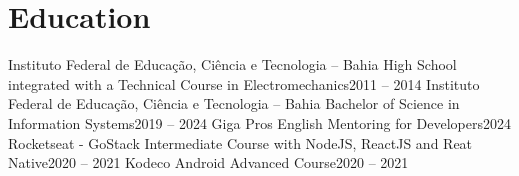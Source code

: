 \section{Education}
  \resumeSubHeadingListStart
    \resumeSubheading
      {Instituto Federal de Educação, Ciência e Tecnologia – Bahia}{}
      {High School integrated with a Technical Course in Electromechanics}{2011 -- 2014}
    \resumeSubheading
      {Instituto Federal de Educação, Ciência e Tecnologia – Bahia}{}
      {Bachelor of Science in Information Systems}{2019 -- 2024}
    \resumeSubheading
      {Giga Pros}{}
      {English Mentoring for Developers}{2024}
    \resumeSubheading
      {Rocketseat - GoStack}{}
      {Intermediate Course with NodeJS, ReactJS and Reat Native}{2020 -- 2021}
    \resumeSubheading
      {Kodeco}{}
      {Android Advanced Course}{2020 -- 2021}
  \resumeSubHeadingListEnd
